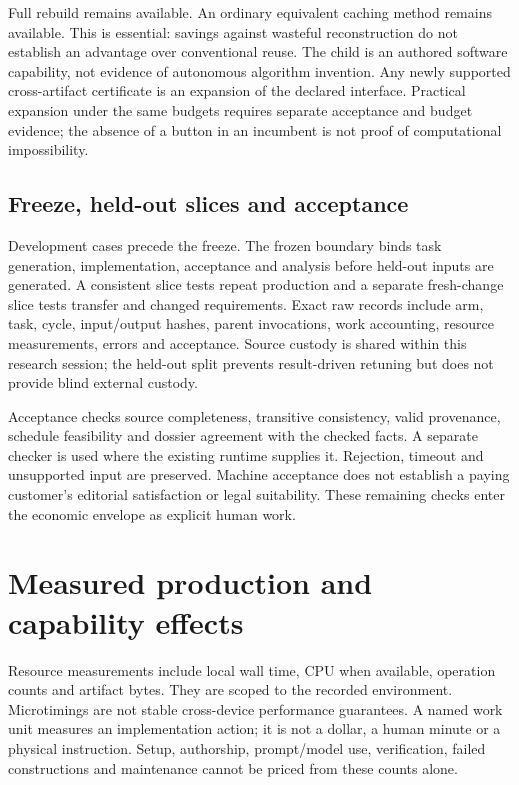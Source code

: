 \documentclass[11pt,a4paper]{article}
\begin{document}
Full rebuild remains available. An ordinary equivalent caching method remains available. This is essential: savings against wasteful reconstruction do not establish an advantage over conventional reuse. The child is an authored software capability, not evidence of autonomous algorithm invention. Any newly supported cross-artifact certificate is an expansion of the declared interface. Practical expansion under the same budgets requires separate acceptance and budget evidence; the absence of a button in an incumbent is not proof of computational impossibility.

\subsection{Freeze, held-out slices and acceptance}
Development cases precede the freeze. The frozen boundary binds task generation, implementation, acceptance and analysis before held-out inputs are generated. A consistent slice tests repeat production and a separate fresh-change slice tests transfer and changed requirements. Exact raw records include arm, task, cycle, input/output hashes, parent invocations, work accounting, resource measurements, errors and acceptance. Source custody is shared within this research session; the held-out split prevents result-driven retuning but does not provide blind external custody.

Acceptance checks source completeness, transitive consistency, valid provenance, schedule feasibility and dossier agreement with the checked facts. A separate checker is used where the existing runtime supplies it. Rejection, timeout and unsupported input are preserved. Machine acceptance does not establish a paying customer's editorial satisfaction or legal suitability. These remaining checks enter the economic envelope as explicit human work.

\section{Measured production and capability effects}
\label{sec:production}


Resource measurements include local wall time, CPU when available, operation counts and artifact bytes. They are scoped to the recorded environment. Microtimings are not stable cross-device performance guarantees. A named work unit measures an implementation action; it is not a dollar, a human minute or a physical instruction. Setup, authorship, prompt/model use, verification, failed constructions and maintenance cannot be priced from these counts alone.
\end{document}
